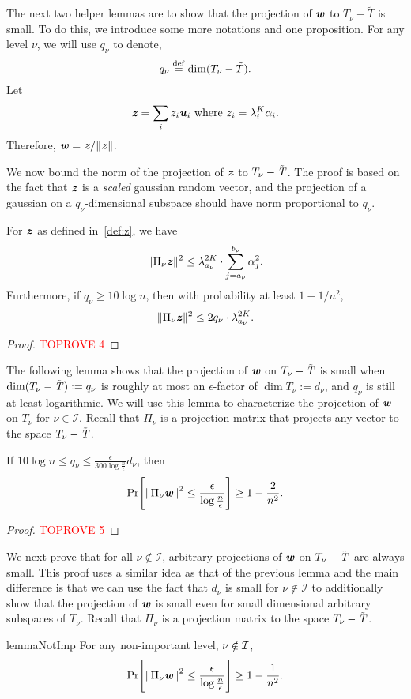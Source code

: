 The next two helper lemmas are to show that the projection of $\boldsymbol{\mathit{w}}$ to $T_{\nu}- \tilde{T}$ is small. To do this, we introduce some more notations and one proposition. 
For any level $\nu$, we will use $q_{\nu}$ to denote,
\begin{equation}
    q_{\nu} \stackrel{\mathrm{def}}{=} \mathrm{dim} (T_{\nu}-\tilde{T}).
\end{equation}
Let 
\begin{equation}\label{def:z}
\boldsymbol{\mathit{z}}=\sum_{i}z_{i}\boldsymbol{\mathit{u}}_{i}\text{ where }z_{i}=\lambda_{i}^{K}\alpha_{i}.
\end{equation} 
Therefore, $\boldsymbol{\mathit{w}}=\boldsymbol{\mathit{z}}/\|\boldsymbol{\mathit{z}}\|$.

We now bound the norm of the projection of $\boldsymbol{\mathit{z}}$ to $T_\nu - {\tilde{\mathit{T}}}$. The proof is based on the fact that $\boldsymbol{\mathit{z}}$ is a {\it scaled} gaussian random vector, and the projection of a gaussian on a $q_{\nu}$-dimensional subspace should have norm proportional to $q_{\nu}$. 
\begin{proposition}\label{lem:projZ}
For $\boldsymbol{\mathit{z}}$ as defined in~\eqref{def:z}, we have
\[
\|\Pi_{\nu}\boldsymbol{\mathit{z}}\|^2 \leq \lambda_{a_{\nu}}^{2K} \cdot \sum_{j=a_{\nu}}^{b_{\nu}}\alpha_j^2.
\] 
Furthermore, if $q_{\nu}\geq 10 \log n$, then with probability at least $1-1/n^2$,
\[
\|\Pi_{\nu}\boldsymbol{\mathit{z}}\|^2 \leq 2q_{\nu}\cdot \lambda_{a_{\nu}}^{2K}.
\]
\end{proposition}
\begin{proof}\textcolor{red}{TOPROVE 4}\end{proof}
The following lemma shows that the projection of $\boldsymbol{\mathit{w}}$ on $T_{\nu}-{\tilde{\mathit{T}}}$ is small when $\mathrm{dim} (T_\nu - {\tilde{\mathit{T}}}):= q_\nu$ is roughly at most an $\epsilon$-factor of $\dim{T_\nu}:= d_\nu$, and $q_\nu$ is still at least logarithmic.
We will use this lemma to characterize the projection of $\boldsymbol{\mathit{w}}$ on $T_{\nu}$ for $\nu \in \mathcal{I}$. 
Recall that $\Pi_\nu$ is a projection matrix that projects any vector to the space $T_{\nu}-{\tilde{\mathit{T}}}$.
\begin{lemma}\label{lem:GaussianProjD}

If $ 10 \log n \leq q_{\nu} \leq \frac{\epsilon}{300\log\frac{n}{\epsilon}}d_{\nu}$, then
\[
\Pr\left[\norm{\Pi_{\nu}\ww}^2 \leq \frac{\epsilon}{\log\frac{n}{\epsilon}} \right] \geq 1-\frac{2}{n^{2}}.
\]
\end{lemma}
\begin{proof}\textcolor{red}{TOPROVE 5}\end{proof}

We next prove that for all $\nu\notin \mathcal{I}$, arbitrary projections of $\boldsymbol{\mathit{w}}$ on $T_{\nu}-{\tilde{\mathit{T}}}$ are always small. This proof uses a similar idea as that of the previous lemma and the main difference is that we can use the fact that $d_{\nu}$ is small for $\nu\notin \mathcal{I}$ to additionally show that the projection of $\boldsymbol{\mathit{w}}$ is small even for small dimensional arbitrary subspaces of $T_{\nu}$. Recall that $\Pi_\nu$ is a projection matrix to the space $T_{\nu}-{\tilde{\mathit{T}}}$.
%
\begin{restatable}{lemma}{NotImp}\label{lem:NotImp}
For any non-important level, $\nu \notin \cal{I}$,
\[
\Pr\left[\norm{\Pi_{\nu}\ww}^2 \leq \frac{\epsilon}{\log\frac{n}{\epsilon}} \right] \geq 1-\frac{1}{n^{2}}.
\]
\end{restatable}

